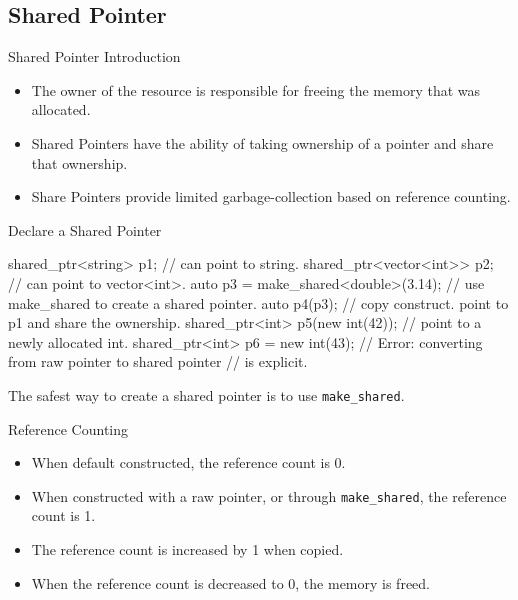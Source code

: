 \subsection{Shared Pointer}
\begin{frame}{Shared Pointer Introduction}
  \begin{itemize}
    \item The owner of the resource is responsible for freeing the memory that was allocated.
    \item Shared Pointers have the ability of taking ownership of a pointer and share that ownership.
    \item Share Pointers provide limited garbage-collection based on reference counting.
  \end{itemize}
\end{frame}
\begin{frame}[fragile]{Declare a Shared Pointer}
  \begin{cpp}
shared_ptr<string> p1;      // can point to string.
shared_ptr<vector<int>> p2; // can point to vector<int>.
auto p3 = make_shared<double>(3.14);
// use make_shared to create a shared pointer.
auto p4(p3);  
// copy construct. point to p1 and share the ownership.
shared_ptr<int> p5(new int(42)); 
// point to a newly allocated int.
shared_ptr<int> p6 = new int(43);
// Error: converting from raw pointer to shared pointer 
// is explicit.
  \end{cpp}
\pause
The safest way to create a shared pointer is to use \texttt{make\_shared}.
\end{frame}
\begin{frame}[fragile]{Reference Counting}
  \begin{itemize}
    \item When default constructed, the reference count is 0.
    \item When constructed with a raw pointer, or through \texttt{make\_shared}, the reference count is 1.
    \item The reference count is increased by 1 when copied.
    \item When the reference count is decreased to 0, the memory is freed.
  \end{itemize}
\end{frame}
